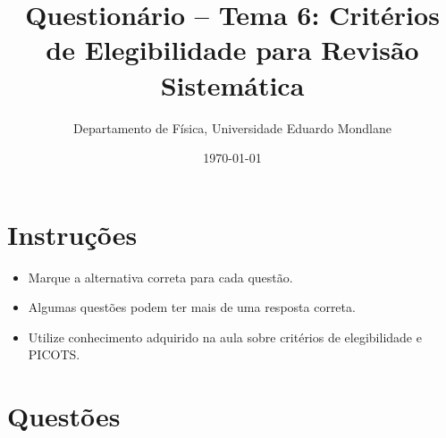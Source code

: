 \documentclass[12pt,a4paper]{article}
\title{Questionário – Tema 6: Critérios de Elegibilidade para Revisão Sistemática}
\author{Departamento de Física, Universidade Eduardo Mondlane}
\date{\today}
\begin{document}
\maketitle
\newpage

\section*{Instruções}
\begin{itemize}
    \item Marque a alternativa correta para cada questão.
    \item Algumas questões podem ter mais de uma resposta correta.
    \item Utilize conhecimento adquirido na aula sobre critérios de elegibilidade e PICOTS.
\end{itemize}

\newpage
\section*{Questões}
\end{document}
